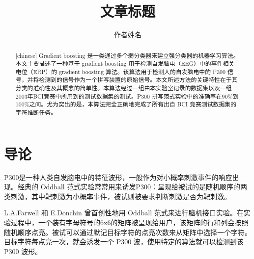 \documentclass[a4paper]{ecust_thesis_translation}
\author{作者姓名}
\title{文章标题}
\begin{document}
\setlength{\parindent}{2em}


  \maketitle

  \begin{abstract}[chinese]
  Gradient boosting 是一类通过多个弱分类器来建立强分类器的机器学习算法。本文主要描述了一种基于 gradient boosting 用于检测自发脑电（EEG）中的事件相关电位（ERP）的 gradient boosting 算法。该算法用于检测人的自发脑电中的 P300 信号，并将检测到的信号作为一个拼写装置的原始信号。本文所述方法的关键特性在于其分类的准确性及其概念的简单性。本算法经过一组由本实验室记录的数据集以及一组2003年BCI竞赛中所用到的测试数据集的测试。P300 拼写范式实验中的准确率在90\%到100\%之间。尤为突出的是，本算法完全正确地完成了所有出自 BCI 竞赛测试数据集的字符推断任务。
  \end{abstract}

  \section{导论}

  P300是一种人类自发脑电中的特征波形，一般作为对小概率刺激事件的响应出现。经典的 Oddball 范式实验常常用来诱发P300：呈现给被试的是随机顺序的两类刺激，其中靶刺激为小概率事件，被试则被要求判断刺激是否为靶刺激。

  L.A.Farwell 和 E.Donchin 曾首创性地用 Oddball 范式来进行脑机接口实验。在实验过程中，一个装有字母符号的6x6的矩阵被呈现给用户，该矩阵的行和列会按照随机顺序点亮。被试可以通过默记目标字符的点亮次数来从矩阵中选择一个字符。目标字符每点亮一次，就会诱发一个 P300 波，使用特定的算法就可以检测到该 P300 波形。
\end{document}
